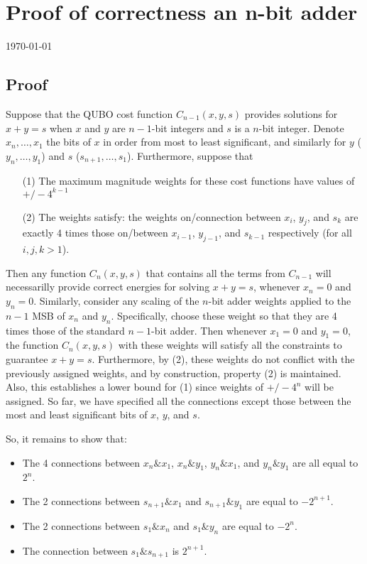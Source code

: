 \documentclass[12pt]{article}
\begin{document}
\section*{Proof of correctness an n-bit adder}
\today

\subsection*{Proof}

Suppose that the QUBO cost function $C_{n-1}(x,y,s)$ provides solutions for
$x+y=s$ when $x$ and $y$ are $n-1$-bit integers and $s$ is a $n$-bit
integer.
Denote $x_n, \ldots, x_1$ the bits of $x$ in order from most to least
significant, and similarly for $y$ ($y_n, \ldots, y_1$) and $s$ 
($s_{n+1}, \ldots, s_1$).
Furthermore, suppose that
\begin{enumerate}
\item[(1)] The maximum magnitude weights for these
cost functions have values of $+/- 4^{k-1}$
\item[(2)] The weights satisfy: the weights on/connection between
$x_i$, $y_j$, and $s_k$ are exactly 4 times those on/between
$x_{i-1}$, $y_{j-1}$, and $s_{k-1}$
respectively (for all $i,j,k > 1$).
\end{enumerate}
Then any function $C_n(x,y,s)$ that contains all the terms from
$C_{n-1}$ will necessarilly provide correct energies for solving $x+y=s$,
whenever $x_n = 0$ and $y_n = 0$.
Similarly, consider any scaling of the $n$-bit adder weights applied
to the $n-1$ MSB of $x_n$ and $y_n$. 
Specifically, choose these weight so that they are 4 times those of the
standard $n-1$-bit adder.
Then whenever $x_1=0$ and $y_1=0$, the function $C_n(x,y,s)$ with these
weights will satisfy all the constraints to guarantee $x+y=s$.
Furthermore, by (2), these weights do not conflict with the previously
assigned weights, and by construction, property (2) is maintained.
Also, this establishes a lower bound for (1) since weights of
$+/- 4^n$ will be assigned.
So far, we have specified all the connections except those between the
most and least significant bits of $x$, $y$, and $s$.

So, it remains to show that:
\begin{itemize}
\item The 4 connections between $x_n \& x_1$, $x_n \& y_1$, $y_n \& x_1$,
and $y_n \& y_1$ are all equal to $2^n$.
\item The 2 connections between $s_{n+1} \& x_1$ and $s_{n+1} \& y_1$ are
equal to $-2^{n+1}$.
\item The 2 connections between $s_1 \& x_n$ and $s_1 \& y_n$ are equal to
$-2^n$.
\item The connection between $s_1 \& s_{n+1}$ is $2^{n+1}$.
\end{itemize}
\end{document}
